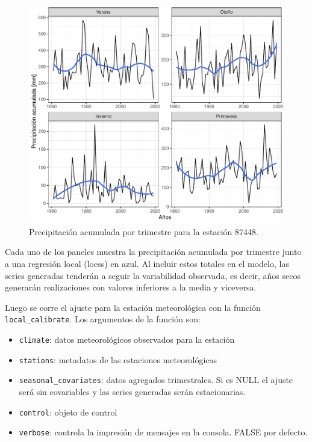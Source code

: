 \documentclass[
  12pt]{article}
\providecommand{\tightlist}{%
  \setlength{\itemsep}{0pt}\setlength{\parskip}{0pt}}
\begin{document}
\begin{figure}[H]

{\centering \includegraphics{Manual_Generador_files/figure-latex/seasonal-prcp-ind-1} 

}

\caption{Precipitación acumulada por trimestre para la estación 87448.}\label{fig:seasonal-prcp-ind}
\end{figure}

Cada uno de los paneles muestra la precipitación acumulada por trimestre junto a una regresión local (loess) en azul. Al incluir estos totales en el modelo, las series generadas tenderán a seguir la variabilidad observada, es decir, años secos generarán realizaciones con valores inferiores a la media y viceversa.

Luego se corre el ajuste para la estación meteorológica con la función \texttt{local\_calibrate}. Los argumentos de la función son:

\begin{itemize}
\tightlist
\item
  \texttt{climate}: datos meteorológicos observados para la estación
\item
  \texttt{stations}: metadatos de las estaciones meteorológicas
\item
  \texttt{seasonal\_covariates}: datos agregados trimestrales. Si es NULL el ajuste será sin covariables y las series generadas serán estacionarias.
\item
  \texttt{control}: objeto de control
\item
  \texttt{verbose}: controla la impresión de mensajes en la consola. FALSE por defecto.
\end{itemize}
\end{document}
